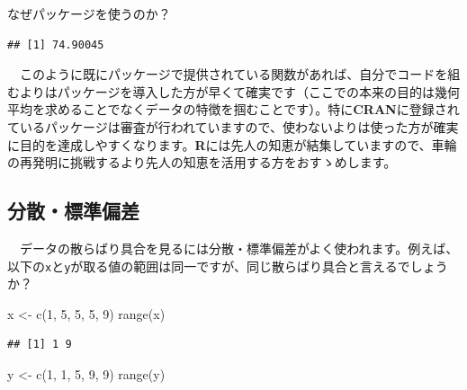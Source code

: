\documentclass[
  12pt,
]{book}
\newenvironment{Shaded}{\begin{snugshade}}{\end{snugshade}}
\newcommand{\DecValTok}[1]{\textcolor[rgb]{0.00,0.00,0.81}{#1}}
\newcommand{\FunctionTok}[1]{\textcolor[rgb]{0.00,0.00,0.00}{#1}}
\newcommand{\NormalTok}[1]{#1}
\newcommand{\OtherTok}[1]{\textcolor[rgb]{0.56,0.35,0.01}{#1}}
\begin{document}
\begin{info-box}{なぜパッケージを使うのか？}
\begin{verbatim}
## [1] 74.90045
\end{verbatim}

　このように既にパッケージで提供されている関数があれば、自分でコードを組むよりはパッケージを導入した方が早くて確実です（ここでの本来の目的は幾何平均を求めることでなくデータの特徴を掴むことです）。特に\textbf{CRAN}に登録されているパッケージは審査が行われていますので、使わないよりは使った方が確実に目的を達成しやすくなります。\textbf{R}には先人の知恵が結集していますので、車輪の再発明に挑戦するより先人の知恵を活用する方をおすゝめします。

\end{info-box}

\newpage

\hypertarget{ux5206ux6563ux6a19ux6e96ux504fux5dee}{%
\subsection{\texorpdfstring{分散・標準偏差}{分散・標準偏差}}\label{ux5206ux6563ux6a19ux6e96ux504fux5dee}}

　データの散らばり具合を見るには分散・標準偏差がよく使われます。例えば、以下の\texttt{x}と\texttt{y}が取る値の範囲は同一ですが、同じ散らばり具合と言えるでしょうか？

\begin{Shaded}
\begin{Highlighting}[numbers=left,,]
\NormalTok{x }\OtherTok{\textless{}{-}} \FunctionTok{c}\NormalTok{(}\DecValTok{1}\NormalTok{, }\DecValTok{5}\NormalTok{, }\DecValTok{5}\NormalTok{, }\DecValTok{5}\NormalTok{, }\DecValTok{9}\NormalTok{)}
\FunctionTok{range}\NormalTok{(x)}
\end{Highlighting}
\end{Shaded}

\begin{verbatim}
## [1] 1 9
\end{verbatim}

\begin{Shaded}
\begin{Highlighting}[numbers=left,,]
\NormalTok{y }\OtherTok{\textless{}{-}} \FunctionTok{c}\NormalTok{(}\DecValTok{1}\NormalTok{, }\DecValTok{1}\NormalTok{, }\DecValTok{5}\NormalTok{, }\DecValTok{9}\NormalTok{, }\DecValTok{9}\NormalTok{)}
\FunctionTok{range}\NormalTok{(y)}
\end{Highlighting}
\end{Shaded}
\end{document}
